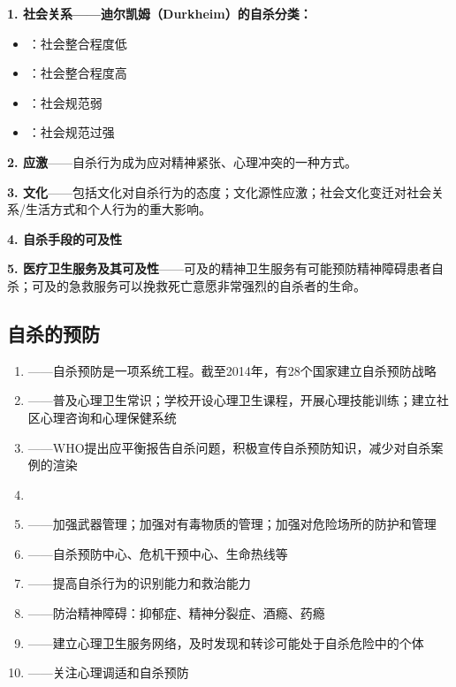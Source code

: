 \begin{defbox}
\textbf{1. 社会关系——迪尔凯姆（Durkheim）的自杀分类：}
\begin{itemize}[leftmargin=*]
    \item {}：社会整合程度低
    \item {}：社会整合程度高
    \item {}：社会规范弱
    \item {}：社会规范过强
\end{itemize}

\textbf{2. 应激}——自杀行为成为应对精神紧张、心理冲突的一种方式。

\textbf{3. 文化}——包括文化对自杀行为的态度；文化源性应激；社会文化变迁对社会关系/生活方式和个人行为的重大影响。

\textbf{4. 自杀手段的可及性}

\textbf{5. 医疗卫生服务及其可及性}——可及的精神卫生服务有可能预防精神障碍患者自杀；可及的急救服务可以挽救死亡意愿非常强烈的自杀者的生命。
\end{defbox}

\subsection{自杀的预防}

\begin{keybox}
\begin{enumerate}[leftmargin=*]
    \item {}——自杀预防是一项系统工程。截至2014年，有28个国家建立自杀预防战略
    \item {}——普及心理卫生常识；学校开设心理卫生课程，开展心理技能训练；建立社区心理咨询和心理保健系统
    \item {}——WHO提出应平衡报告自杀问题，积极宣传自杀预防知识，减少对自杀案例的渲染
    \item {}
    \item {}——加强武器管理；加强对有毒物质的管理；加强对危险场所的防护和管理
    \item {}——自杀预防中心、危机干预中心、生命热线等
    \item {}——提高自杀行为的识别能力和救治能力
    \item {}——防治精神障碍：抑郁症、精神分裂症、酒瘾、药瘾
    \item {}——建立心理卫生服务网络，及时发现和转诊可能处于自杀危险中的个体
    \item {}——关注心理调适和自杀预防
\end{enumerate}
\end{keybox}

